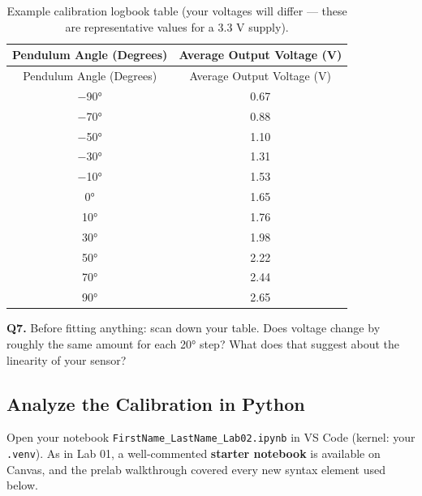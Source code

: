 \documentclass[
  12pt,
  letterpaper,
]{article}
\begin{document}
\begin{longtable}[]{@{}cc@{}}
\caption{Example calibration logbook table (your voltages will differ
--- these are representative values for a 3.3 V
supply).}\label{tbl-calibration}\tabularnewline
\toprule\noalign{}
Pendulum Angle (Degrees) & Average Output Voltage (V) \\
\midrule\noalign{}
\endfirsthead
\toprule\noalign{}
Pendulum Angle (Degrees) & Average Output Voltage (V) \\
\midrule\noalign{}
\endhead
\bottomrule\noalign{}
\endlastfoot
−90° & 0.67 \\
−70° & 0.88 \\
−50° & 1.10 \\
−30° & 1.31 \\
−10° & 1.53 \\
0° & 1.65 \\
10° & 1.76 \\
30° & 1.98 \\
50° & 2.22 \\
70° & 2.44 \\
90° & 2.65 \\
\end{longtable}

\begin{tcolorbox}[enhanced jigsaw, arc=.35mm, bottomrule=.15mm, bottomtitle=1mm, breakable, colback=white, colbacktitle=quarto-callout-important-color!10!white, colframe=quarto-callout-important-color-frame, coltitle=black, left=2mm, leftrule=.75mm, opacityback=0, opacitybacktitle=0.6, rightrule=.15mm, title=\textcolor{quarto-callout-important-color}{\faExclamation}\hspace{0.5em}{Logbook Questions}, titlerule=0mm, toprule=.15mm, toptitle=1mm]

\textbf{Q7.} Before fitting anything: scan down your table. Does voltage
change by roughly the same amount for each 20° step? What does that
suggest about the linearity of your sensor?

\end{tcolorbox}

\subsection{Analyze the Calibration in
Python}\label{analyze-the-calibration-in-python}

Open your notebook \texttt{FirstName\_LastName\_Lab02.ipynb} in VS Code
(kernel: your \texttt{.venv}). As in Lab 01, a well-commented
\textbf{starter notebook} is available on Canvas, and the prelab
walkthrough covered every new syntax element used below.
\end{document}
